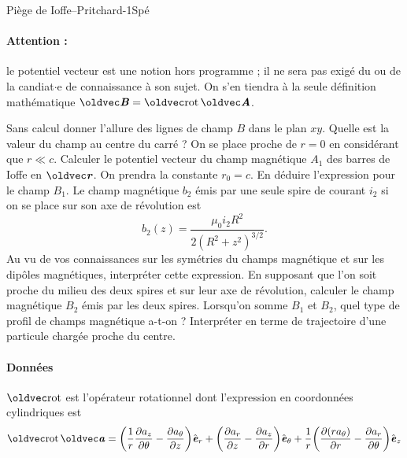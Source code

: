 \begin{exercise}{Piège de Ioffe--Pritchard}{-1}{Spé}
\begin{questions}
{    \paragraph{Attention :} le potentiel vecteur est une notion hors programme ; il ne sera pas exigé du ou de la candiat$\cdot$e de connaissance à son sujet. On s'en tiendra à la seule définition mathématique $\vB = \rot\vA$.}
    \question Sans calcul donner l'allure des lignes de champ $B$ dans le plan $xy$. Quelle est la valeur du champ au centre du carré ?
    \question On se place proche de $r=0$ en considérant que $r\ll c$. Calculer le potentiel vecteur du champ magnétique $A_1$ des barres de Ioffe en $\vr$. On prendra la constante $r_0 = c$.
    \question En déduire l'expression pour le champ $B_1$.
    \question 
    Le champ magnétique $b_2$ émis par une seule spire de courant $i_2$ si on se place sur son axe de révolution est
    $$b_2(z) = \dfrac{\mu_0 i_2 R^2}{2(R^2+z^2)^{3/2}}.$$
    Au vu de vos connaissances sur les symétries du champs magnétique et sur les dipôles magnétiques, interpréter cette expression.
    \question En supposant que l'on soit proche du milieu des deux spires et sur leur axe de révolution, calculer le champ magnétique $B_2$ émis par les deux spires.
    \question Lorsqu'on somme $B_1$ et $B_2$, quel type de profil de champs magnétique a-t-on ? Interpréter en terme de trajectoire d'une particule chargée proche du centre.
\end{questions}

\paragraph{Données} $\rot$ est l'opérateur rotationnel dont l'expression en coordonnées cylindriques est
$$\rot\vec{a} = \qty(\dfrac{1}{r}\pdv{a_z}{\theta} - \pdv{a_\theta}{z})\ve_r +\qty(\pdv{a_r}{z} - \pdv{a_z}{r})\ve_\theta + \dfrac{1}{r}\qty(\pdv{(ra_\theta)}{r} - \pdv{a_r}{\theta})\ve_z$$

\end{exercise}
